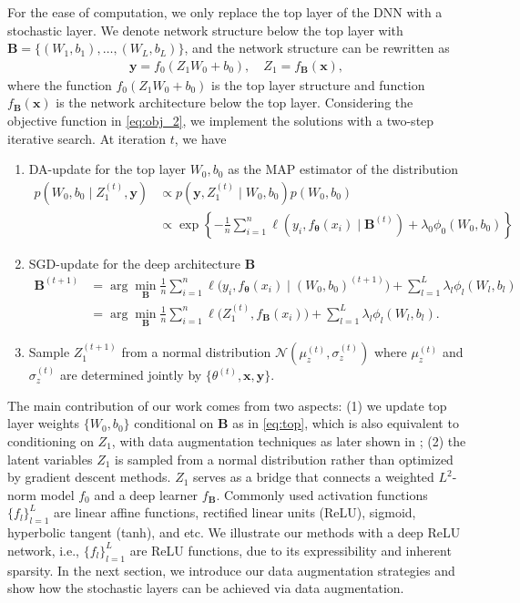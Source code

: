 \documentclass[ba]{imsart}
\newcommand{\bm}[1]{\boldsymbol{#1}}
\def\B{\bm{B}}
\def\x{\bm{x}}
\def\y{\bm{y}}
\def\btheta{\bm{\theta}}
\def\mN{\mathcal{N}}
\newcommand{\bx}{{\bm x}}
\newcommand{\by}{{\bm y}}
\numberwithin{equation}{section}
\theoremstyle{plain}
\begin{document}
For the ease of  computation, we only  replace the top layer of the  DNN with  a stochastic layer. We denote network structure below the top layer with  $\B=\{(W_1, b_1), \ldots, (W_L,b_L)\}$, and the network structure can be rewritten as
\begin{align*}
\by=f_0( Z_1 W_0 +b_0),\quad  Z_1 = f_{\B}(\bx),
\end{align*}
where the function $f_0(Z_1 W_0+b_0)$ is the top layer structure and function $f_{\B}(\bx)$ is the network architecture below the top layer. Considering the objective function in \eqref{eq:obj_2}, we implement the solutions with a two-step iterative search. At iteration $t$, we have
\begin{enumerate}[noitemsep]
\vspace{-0.1in}
\item DA-update for the top layer ${W_0, b_0}$  as the MAP estimator of the distribution
\begin{align}
p(W_0, b_0 \mid Z_1^{(t)}, \y)&\propto p(\y, Z_1^{(t)}\mid W_0, b_0 )p(W_0, b_0) \label{eq:top} \\
&\propto \exp\left\{- \frac{1}{n} 
\sum_{i=1}^n \ell(y_i, f_{\btheta}(x_i)\mid \B^{(t)})+\lambda_0 \phi_0(W_0, b_0)\right\}\nonumber
\end{align}
\item SGD-update for the deep architecture $\B$
\begin{align*}
\B^{(t+1)}&=\arg \min_{\B}  \frac{1}{n} 
\sum_{i=1}^n \ell\big(y_i, f_{\btheta}(x_i)\mid (W_0, b_0)^{(t+1)}\big)+\sum_{l=1}^L\lambda_l \phi_l(W_l, b_l)\\
&=\arg \min_{\B}  \frac{1}{n} 
\sum_{i=1}^n \ell\big(Z_1^{(t)}, f_{\B}(x_i)\big)+\sum_{l=1}^L\lambda_l \phi_l(W_l, b_l).
\end{align*}
\item Sample $Z_1^{(t+1)}$ from a normal distribution $\mN(\mu_z^{(t)}, \sigma_z^{(t)})$ where $\mu_z^{(t)}$ and $\sigma_z^{(t)}$ are determined jointly by $\{\theta^{(t)}, \x, \y\}$.
\vspace{-0.1in}
\end{enumerate}


The main contribution of our work comes from two aspects: (1) we  update top layer weights $\{W_0, b_0\}$ conditional on $\B$ as in \eqref{eq:top}, which is also equivalent to conditioning on $Z_1$, with data augmentation techniques as later shown in  ; (2) the latent variables $Z_1$ is sampled from a normal distribution rather than optimized by gradient descent methods. $Z_1$ serves as a bridge that connects a  weighted $L^2$-norm model $f_0$ and a deep learner $f_{\B}$.  Commonly used activation functions $\{f_l\}_{l=1}^L$ are linear affine functions, rectified linear units (ReLU), sigmoid, hyperbolic tangent (tanh), and etc.  We illustrate our methods with a deep ReLU network, i.e., $\{f_l\}_{l=1}^L$ are ReLU functions, due to its expressibility and  inherent sparsity. In the next section, we introduce our data augmentation strategies and show how the stochastic layers can be achieved via data augmentation.
\end{document}

